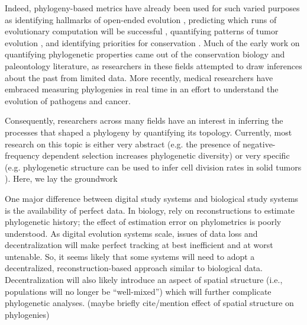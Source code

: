 Indeed, phylogeny-based metrics have already been used for such varied purposes as identifying hallmarks of open-ended evolution \citep{dolsonMODESToolboxMeasurements2019}, predicting which runs of evolutionary computation will be successful \citep{hernandezWhatCanPhylogenetic2022a, shahbandeganUntanglingPhylogeneticDiversity2022a}, quantifying patterns of tumor evolution \citep{scottInferringTumorProliferative2020, lewinsohnStatedependentEvolutionaryModels2023}, and identifying priorities for conservation \citep{forestPreservingEvolutionaryPotential2007}. Much of the early work on quantifying phylogenetic properties came out of the conservation biology and paleontology literature, as researchers in these fields attempted to draw inferences about the past from limited data. More recently, medical researchers have embraced measuring phylogenies in real time in an effort to understand the evolution of pathogens and cancer. 

Consequently, researchers across many fields have an interest in inferring the processes that shaped a phylogeny by quantifying its topology. Currently, most research on this topic is either very abstract (e.g. the presence of negative-frequency dependent selection increases phylogenetic diversity) or very specific (e.g. phylogenetic structure can be used to infer cell division rates in solid tumors \citep{lewinsohnStatedependentEvolutionaryModels2023}). Here, we  lay the groundwork 


One major difference between digital study systems and biological study systems is the availability of perfect data.
In biology, rely on reconstructions to estimate phylogenetic history; the effect of estimation error on phylometrics is poorly understood.
As digital evolution systems scale, issues of data loss and decentralization will make perfect tracking at best inefficient and at worst untenable.
So, it seems likely that some systems will need to adopt a decentralized, reconstruction-based approach similar to biological data.
Decentralization will also likely introduce an aspect of spatial structure (i.e., populations will no longer be ``well-mixed'') which will further complicate phylogenetic analyses.
(maybe briefly cite/mention effect of spatial structure on phylogenies)

